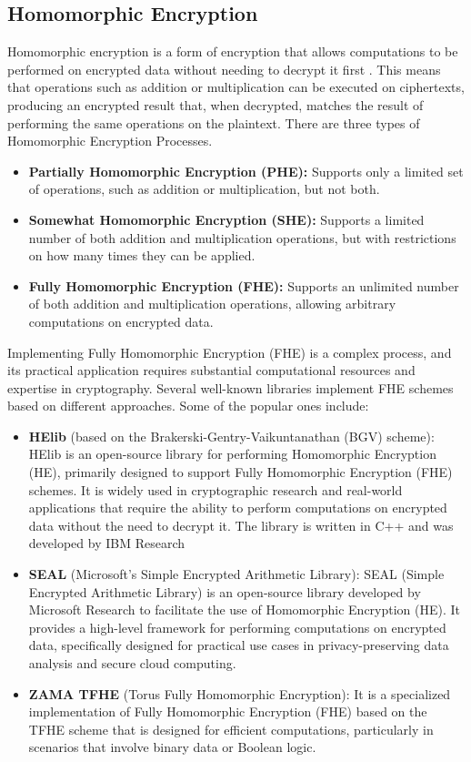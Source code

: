 \documentclass[conference]{IEEEtran}
\begin{document}
\subsection{Homomorphic Encryption}
Homomorphic encryption is a form of encryption that allows computations to be performed on encrypted data without needing to decrypt it first \cite{b22}. This means that operations such as addition or multiplication can be executed on ciphertexts, producing an encrypted result that, when decrypted, matches the result of performing the same operations on the plaintext. There are three types of Homomorphic Encryption Processes.
\begin{itemize}
    \item \textbf{Partially Homomorphic Encryption (PHE):} Supports only a limited set of operations, such as addition or multiplication, but not both.
    \item \textbf{Somewhat Homomorphic Encryption (SHE):} Supports a limited number of both addition and multiplication operations, but with restrictions on how many times they can be applied.
    \item \textbf{Fully Homomorphic Encryption (FHE):} Supports an unlimited number of both addition and multiplication operations, allowing arbitrary computations on encrypted data.
\end{itemize}
Implementing Fully Homomorphic Encryption (FHE) is a complex process, and its practical application requires substantial computational resources and expertise in cryptography. Several well-known libraries implement FHE schemes based on different approaches. Some of the popular ones include:
\begin{itemize}
    \item \textbf{HElib} (based on the Brakerski-Gentry-Vaikuntanathan (BGV) scheme): HElib is an open-source library for performing Homomorphic Encryption (HE), primarily designed to support Fully Homomorphic Encryption (FHE) schemes. It is widely used in cryptographic research and real-world applications that require the ability to perform computations on encrypted data without the need to decrypt it. The library is written in C++ and was developed by IBM Research
    \item \textbf{SEAL} (Microsoft’s Simple Encrypted Arithmetic Library): SEAL (Simple Encrypted Arithmetic Library) is an open-source library developed by Microsoft Research to facilitate the use of Homomorphic Encryption (HE). It provides a high-level framework for performing computations on encrypted data, specifically designed for practical use cases in privacy-preserving data analysis and secure cloud computing.
    \item \textbf{ZAMA TFHE} (Torus Fully Homomorphic Encryption): It is a specialized implementation of Fully Homomorphic Encryption (FHE) based on the TFHE scheme that is designed for efficient computations, particularly in scenarios that involve binary data or Boolean logic.
\end{itemize}
\end{document}
